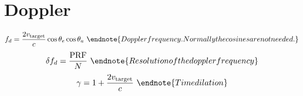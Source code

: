 \section{Doppler}
\begin{multicols}{3} \noindent
	$$f_d = \frac{2 v_\text{target}}{c} \cos{\theta_e} \cos{\theta_a} \
		\endnote{Doppler frequency. Normally the cosines are not needed.}
		$$
	$$\delta f_d = \frac{\text{PRF}}{N} \
		\endnote{Resolution of the doppler frequency}
		$$
	$$ \gamma = 1 + \frac{2v_\text{target}}{c} \
		\endnote{Time dilation}
	$$
\end{multicols}
\printendnotes[itemize]
